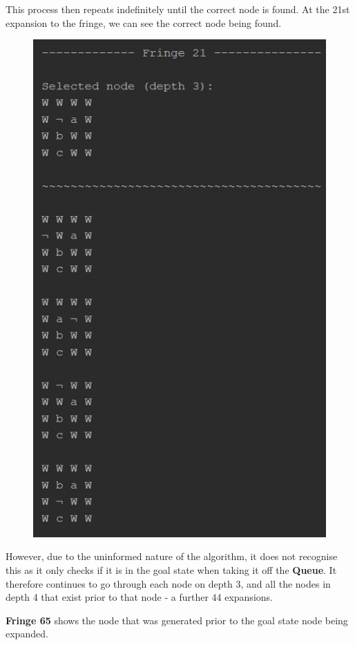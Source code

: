 \documentclass{article}
\begin{document}
	This process then repeats indefinitely until the correct node is found. At the 21st expansion to the fringe, we can see the correct node being found.
	\begin{figure}[h]
		\centering
		\includegraphics{BFS-1-4.png}
	\end{figure}

	However, due to the uninformed nature of the algorithm, it does not recognise this as it only checks if it is in the goal state when taking it off the \textbf{Queue}. It therefore continues to go through each node on depth 3, and all the nodes in depth 4 that exist prior to that node - a further 44 expansions. 
	
	\newpage
	\textbf{Fringe 65} shows the node that was generated prior to the goal state node being expanded.
	
\end{document}
